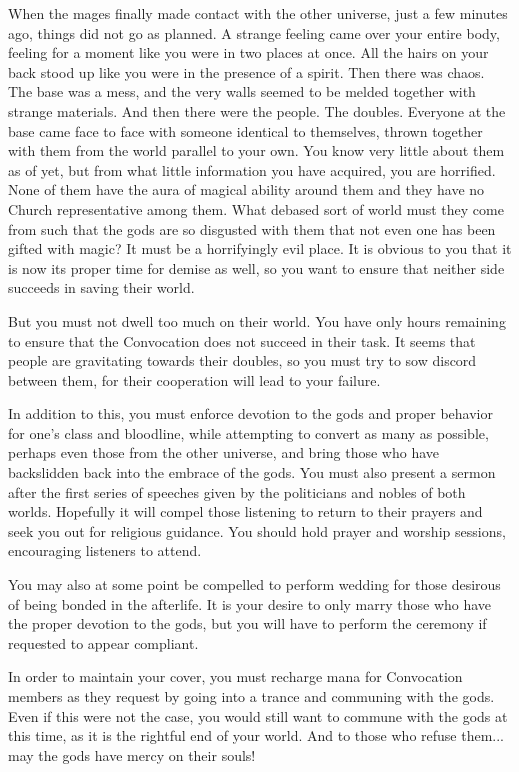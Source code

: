 \documentclass[char]{guildcamp3}
\begin{document}
When the mages finally made contact with the other universe, just a few minutes ago, things did not go as planned. A strange feeling came over your entire body, feeling for a moment like you were in two places at once. All the hairs on your back stood up like you were in the presence of a spirit. Then there was chaos. The base was a mess, and the very walls seemed to be melded together with strange materials. And then there were the people. The doubles. Everyone at the base came face to face with someone identical to themselves, thrown together with them from the world parallel to your own. You know very little about them as of yet, but from what little information you have acquired, you are horrified. None of them have the aura of magical ability around them and they have no Church representative among them. What debased sort of world must they come from such that the gods are so disgusted with them that not even one has been gifted with magic? It must be a horrifyingly evil place. It is obvious to you that it is now its proper time for demise as well, so you want to ensure that neither side succeeds in saving their world.

But you must not dwell too much on their world. You have only hours remaining to ensure that the Convocation does not succeed in their task. It seems that people are gravitating towards their doubles, so you must try to sow discord between them, for their cooperation will lead to your failure.

In addition to this, you must enforce devotion to the gods and proper behavior for one's class and bloodline, while attempting to convert as many as possible, perhaps even those from the other universe, and bring those who have backslidden back into the embrace of the gods. You must also present a sermon after the first series of speeches given by the politicians and nobles of both worlds. Hopefully it will compel those listening to return to their prayers and seek you out for religious guidance. You should hold prayer and worship sessions, encouraging listeners to attend.

You may also at some point be compelled to perform wedding for those desirous of being bonded in the afterlife. It is your desire to only marry those who have the proper devotion to the gods, but you will have to perform the ceremony if requested to appear compliant.

In order to maintain your cover, you must recharge mana for Convocation members as they request by going into a trance and communing with the gods. Even if this were not the case, you would still want to commune with the gods at this time, as it is the rightful end of your world. And to those who refuse them... may the gods have mercy on their souls! 
\end{document}
